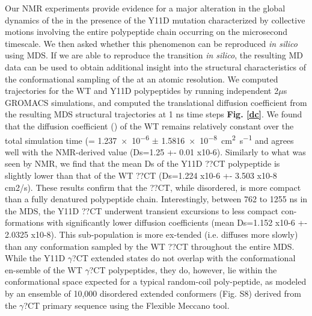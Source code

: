 Our NMR experiments provide evidence for a major alteration in the global dynamics of the \gct in the presence of the Y11D mutation characterized by collective motions involving the entire polypeptide chain occurring on the microsecond timescale. We then asked whether this phenomenon can be reproduced \textit{in silico} using MDS.  If we are able to reproduce the transition \textit{in silico}, the resulting MD data can be used to obtain additional insight into the structural characteristics of the conformational sampling of the \gct at an atomic resolution. We computed trajectories for the WT and Y11D \gct polypeptides by running independent 2$\mu$s GROMACS simulations, and computed the translational diffusion coefficient from the resulting MDS structural trajectories at 1 ns time steps {\bf Fig. \ref{dc}}. We found that the diffusion coefficient (\diffusion) of the WT \gct remains relatively constant over the total simulation time (\diffusion = \num{1.237e-6} $\pm$ \SI{1.5816e-8}{\cm\squared\per\second} and agrees well with the NMR-derived value (Ds=1.25 +- 0.01 x10-6).  Similarly to what was seen by NMR, we find that the mean Ds of the Y11D ??CT polypeptide is slightly lower than that of the WT ??CT (Ds=1.224 x10-6 +- 3.503 x10-8 cm2/s). These results confirm that the ??CT, while disordered, is more compact than a fully denatured polypeptide chain. Interestingly, between 762 to 1255 ns in the MDS, the Y11D ??CT underwent transient excursions to less compact con-formations with significantly lower diffusion coefficients (mean Ds=1.152 x10-6 +- 2.0325 x10-8). This sub-population is more ex-tended (i.e. diffuses more slowly) than any conformation sampled by the WT ??CT throughout the entire MDS. While the Y11D $\gamma$?CT extended states do not overlap with the conformational en-semble of the WT $\gamma$?CT polypeptides, they do, however, lie within the conformational space expected for a typical random-coil poly-peptide, as modeled by an ensemble of 10,000 disordered extended conformers (Fig. S8) derived from the $\gamma$?CT primary sequence using the Flexible Meccano tool.  

